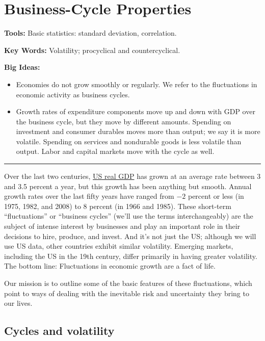 \chapter{Business-Cycle Properties}\label{chp:bcpr}
\hypertarget{cycles}{}

\textbf{Tools: }Basic statistics:  standard deviation, correlation.

\textbf{Key Words:} Volatility; procyclical and countercyclical.

\textbf{Big Ideas:}
\vspace{-0.1in}
\begin{itemize}
\item Economies do not grow smoothly or regularly.
We refer to the fluctuations in economic activity as business cycles.
\item Growth rates of expenditure components move up and down with GDP over the business cycle,
but they move by different amounts.
Spending on investment and consumer durables moves more than output; we say it is more volatile.
Spending on services and nondurable goods is less volatile than output.
Labor and capital markets move with the cycle as well.
\end{itemize}
\rule{\textwidth}{1pt}

Over the last two centuries,
\href{http://research.stlouisfed.org/fred2/series/GDPC1?cid=106}{US real GDP}
has grown at an average
rate between 3 and 3.5 percent a year,
but this growth has been anything but smooth.
Annual growth rates over the last fifty years have
ranged from $-2$ percent or less (in 1975, 1982, and 2008)
to 8 percent (in 1966 and 1985).
These short-term ``fluctuations'' or ``business cycles''
(we'll use the terms interchangeably)
are the subject of intense interest by businesses
and play an important role in their decisions to hire, produce, and invest.
And it's not just the US;
although we will use US data, other countries exhibit similar
volatility.
Emerging markets, including the US in the 19th century,
differ primarily in having greater volatility.
The bottom line:  Fluctuations in economic growth
are a fact of life.

Our mission is to outline some of the basic features
of these fluctuations, which point to ways of dealing with
the inevitable risk and uncertainty they bring to our lives.


\section{Cycles and volatility}

